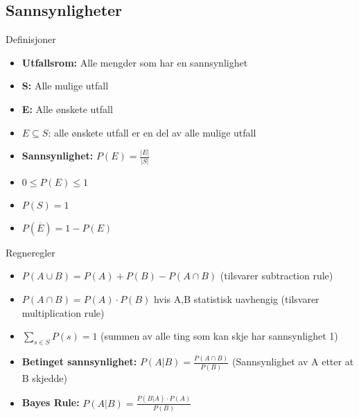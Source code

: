 

\subsection{Sannsynligheter}
\begin{frame}{Definisjoner}
\begin{itemize}[<+->]
\item \textbf{Utfallsrom: }Alle mengder som har en sannsynlighet
\item \textbf{S: }Alle mulige utfall
\item \textbf{E: }Alle ønskete utfall
\item $E \subseteq S$: alle ønskete utfall er en del av alle mulige utfall
\item \textbf{Sannsynlighet: }$P(E)=\frac{|E|}{|S|}$
\item $0 \leq P(E) \leq 1$
\item $P(S)=1$
\item $P(\overline{E})=1-P(E)$
\end{itemize}
\end{frame}

\begin{frame}{Regneregler}
\begin{itemize}[<+->]
\item $P(A\cup B)=P(A)+P(B)-P(A\cap B)$ (tilsvarer subtraction rule)
\item $P(A\cap B)=P(A)\cdot P(B)$ hvis A,B statistisk uavhengig (tilsvarer multiplication rule)
\item $\sum_{s\in S} P(s) = 1 $ (summen av alle ting som kan skje har sannsynlighet 1)
\item \textbf{Betinget sannsynlighet: }$P(A|B)=\frac{P(A\cap B)}{P(B)}$ (Sannsynlighet av A etter at B skjedde)
\item \textbf{Bayes Rule: }$P(A|B)=\frac{P(B|A)\cdot P(A)}{P(B)}$
\end{itemize}
\end{frame}

